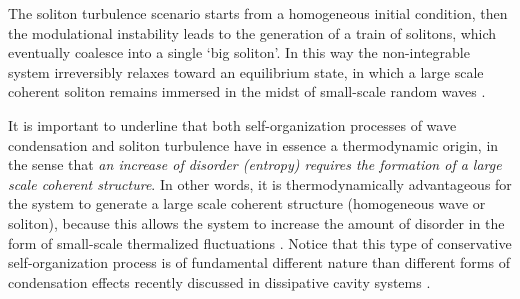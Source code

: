 \documentclass[pra,twocolumn,showpacs,preprintnumbers,amsmath,amssymb]{revtex4}
\begin{document}
The soliton turbulence scenario starts from a homogeneous initial condition, then the modulational instability leads to the generation of a train of solitons, which eventually coalesce into a single `big soliton'.
In this way the non-integrable system irreversibly relaxes toward an equilibrium state, in which a large scale coherent soliton remains immersed in the midst of small-scale random waves \cite{jordan,rumpf01,rumpf03,ZakhPhysRep01,nazarenkoPR,nazarenko,shalva}.

It is important to underline that both self-organization processes of wave condensation and soliton turbulence have in essence a thermodynamic origin, in the sense that {\it an increase of disorder (entropy) requires the formation of a large scale coherent structure}.
In other words, it is thermodynamically advantageous for the system to generate a large scale coherent structure (homogeneous wave or soliton), because this allows the system to increase the amount of disorder in the form of small-scale thermalized fluctuations \cite{zakharov88,zakharov89,jordan,rumpf01,rumpf03,
ZakhPhysRep01,PRL05,PD09,nazarenko,PR14}.
Notice that this type of conservative self-organization process is of fundamental different nature than different forms of condensation effects recently discussed in dissipative cavity systems \cite{conti08,fischer10,fischer14,PRA11c,
derevyanko12,turitsyn12,turitsyn13,carusotto13}.
\end{document}
